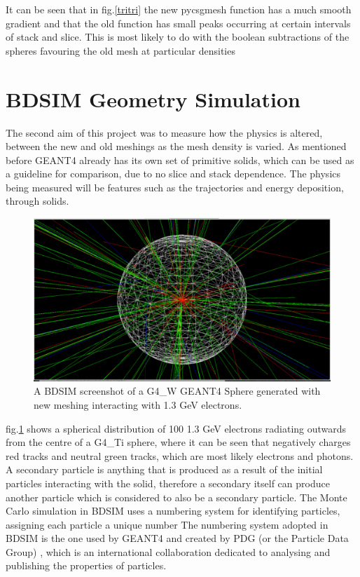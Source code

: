 \documentclass[12pt,a4paper]{article}
\begin{document}
\noindent It can be seen that in fig.\ref{tritri} the new pycsgmesh function has a much smooth gradient and that the old function has small peaks occurring at certain intervals of stack and slice. This is most likely to do with the boolean subtractions of the spheres favouring the old mesh at particular densities


\section{BDSIM Geometry Simulation}
\label{int}
The second aim of this project was to measure how the physics is altered, between the new and old meshings as the mesh density is varied. As mentioned before GEANT4 already has its own set of primitive solids, which can be used as a guideline for comparison, due to no slice and stack dependence. The physics being measured will be features such as the trajectories and energy deposition, through solids.

\begin{figure}[h!]
\centering
\includegraphics[scale=0.33]{Images//BDSIM//titanium.pdf}
\caption[width=\columnwidth]{A BDSIM screenshot of a G4\_W GEANT4 Sphere generated with new meshing interacting with 1.3 GeV electrons.}
\label{black}
\end{figure}

\noindent fig.\ref{black} shows a spherical distribution of 100 1.3 GeV electrons radiating outwards from the centre of a G4\_Ti sphere, where it can be seen that negatively charges red tracks and neutral green tracks, which are most likely electrons and photons. A secondary particle is anything that is produced as a result of the initial particles interacting with the solid, therefore a secondary itself can produce another particle which is considered to also be  a secondary particle. The Monte Carlo simulation in BDSIM uses a numbering system for identifying particles, assigning each particle a unique number The numbering system adopted in BDSIM is the one used by GEANT4 and created by PDG (or the Particle Data Group) \cite{pdg}, which is an international collaboration dedicated to analysing and publishing the properties of particles. 
\end{document}

